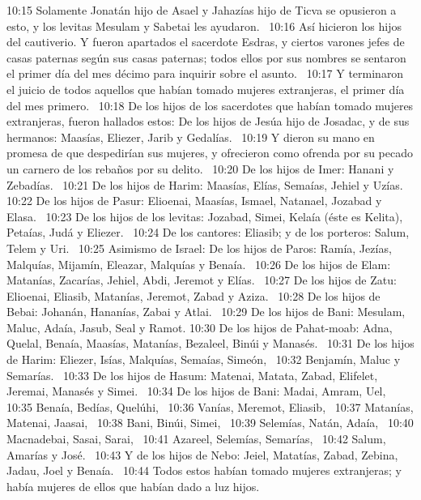10:15 Solamente Jonatán hijo de Asael y Jahazías hijo de Ticva se opusieron a esto, y los levitas Mesulam y Sabetai les ayudaron.  
10:16 Así hicieron los hijos del cautiverio. Y fueron apartados el sacerdote Esdras, y ciertos varones jefes de casas paternas según sus casas paternas; todos ellos por sus nombres se sentaron el primer día del mes décimo para inquirir sobre el asunto.  
10:17 Y terminaron el juicio de todos aquellos que habían tomado mujeres extranjeras, el primer día del mes primero.  
10:18 De los hijos de los sacerdotes que habían tomado mujeres extranjeras, fueron hallados estos: De los hijos de Jesúa hijo de Josadac, y de sus hermanos: Maasías, Eliezer, Jarib y Gedalías.  
10:19 Y dieron su mano en promesa de que despedirían sus mujeres, y ofrecieron como ofrenda por su pecado un carnero de los rebaños por su delito.  
10:20 De los hijos de Imer: Hanani y Zebadías.  
10:21 De los hijos de Harim: Maasías, Elías, Semaías, Jehiel y Uzías.  
10:22 De los hijos de Pasur: Elioenai, Maasías, Ismael, Natanael, Jozabad y Elasa.  
10:23 De los hijos de los levitas: Jozabad, Simei, Kelaía (éste es Kelita), Petaías, Judá y Eliezer.  
10:24 De los cantores: Eliasib; y de los porteros: Salum, Telem y Uri.  
10:25 Asimismo de Israel: De los hijos de Paros: Ramía, Jezías, Malquías, Mijamín, Eleazar, Malquías y Benaía.  
10:26 De los hijos de Elam: Matanías, Zacarías, Jehiel, Abdi, Jeremot y Elías.  
10:27 De los hijos de Zatu: Elioenai, Eliasib, Matanías, Jeremot, Zabad y Aziza.  
10:28 De los hijos de Bebai: Johanán, Hananías, Zabai y Atlai.  
10:29 De los hijos de Bani: Mesulam, Maluc, Adaía, Jasub, Seal y Ramot. 
10:30 De los hijos de Pahat-moab: Adna, Quelal, Benaía, Maasías, Matanías, Bezaleel, Binúi y Manasés.  
10:31 De los hijos de Harim: Eliezer, Isías, Malquías, Semaías, Simeón,  
10:32 Benjamín, Maluc y Semarías.  
10:33 De los hijos de Hasum: Matenai, Matata, Zabad, Elifelet, Jeremai, Manasés y Simei.  
10:34 De los hijos de Bani: Madai, Amram, Uel,  
10:35 Benaía, Bedías, Quelúhi,  
10:36 Vanías, Meremot, Eliasib,  
10:37 Matanías, Matenai, Jaasai,  
10:38 Bani, Binúi, Simei,  
10:39 Selemías, Natán, Adaía,  
10:40 Macnadebai, Sasai, Sarai,  
10:41 Azareel, Selemías, Semarías,  
10:42 Salum, Amarías y José.  
10:43 Y de los hijos de Nebo: Jeiel, Matatías, Zabad, Zebina, Jadau, Joel y Benaía.  
10:44 Todos estos habían tomado mujeres extranjeras; y había mujeres de ellos que habían dado a luz hijos.